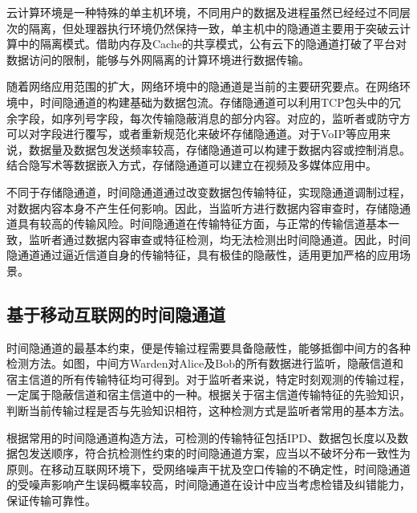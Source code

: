 云计算环境是一种特殊的单主机环境，不同用户的数据及进程虽然已经经过不同层次的隔离，但处理器执行环境仍然保持一致，单主机中的隐通道主要用于突破云计算中的隔离模式。借助内存及Cache的共享模式，公有云下的隐通道打破了平台对数据访问的限制，能够与外网隔离的计算环境进行数据传输。

随着网络应用范围的扩大，网络环境中的隐通道是当前的主要研究要点。在网络环境中，时间隐通道的构建基础为数据包流。存储隐通道可以利用TCP包头中的冗余字段，如序列号字段，每次传输隐蔽消息的部分内容。对应的，监听者或防守方可以对字段进行覆写，或者重新规范化来破坏存储隐通道。对于VoIP等应用来说，数据量及数据包发送频率较高，存储隐通道可以构建于数据内容或控制消息。结合隐写术等数据嵌入方式，存储隐通道可以建立在视频及多媒体应用中。

不同于存储隐通道，时间隐通道通过改变数据包传输特征，实现隐通道调制过程，对数据内容本身不产生任何影响。因此，当监听方进行数据内容审查时，存储隐通道具有较高的传输风险。时间隐通道在传输特征方面，与正常的传输信道基本一致，监听者通过数据内容审查或特征检测，均无法检测出时间隐通道。因此，时间隐通道通过逼近信道自身的传输特征，具有极佳的隐蔽性，适用更加严格的应用场景。

\subsection{基于移动互联网的时间隐通道}
\label{sec:intro:background:ctc}

时间隐通道的最基本约束，便是传输过程需要具备隐蔽性，能够抵御中间方的各种检测方法。如图，中间方Warden对Alice及Bob的所有数据进行监听，隐蔽信道和宿主信道的所有传输特征均可得到。对于监听者来说，特定时刻观测的传输过程，一定属于隐蔽信道和宿主信道中的一种。根据关于宿主信道传输特征的先验知识，判断当前传输过程是否与先验知识相符，这种检测方式是监听者常用的基本方法。

根据常用的时间隐通道构造方法，可检测的传输特征包括IPD、数据包长度以及数据包发送顺序，符合抗检测性约束的时间隐通道方案，应当以不破坏分布一致性为原则。在移动互联网环境下，受网络噪声干扰及空口传输的不确定性，时间隐通道的受噪声影响产生误码概率较高，时间隐通道在设计中应当考虑检错及纠错能力，保证传输可靠性。

